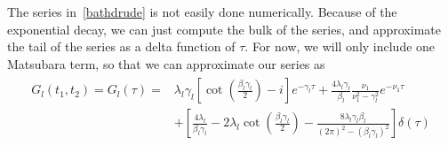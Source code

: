 \documentclass{article}
\newcommand{\ten}{\otimes}
\newcommand{\I}{\mathcal{I}}
\begin{document}
The series in~\ref{bathdrude} is not easily done numerically. Because of the exponential decay, we can just compute the bulk of the series, and approximate the tail of the series as a delta function of $\tau$. For now, we will only include one Matsubara term, so that we can approximate our series as
\begin{align}\label{corrapprox}
\begin{split}
G_l(t_1,t_2) = G_l(\tau) = &\lambda_l\gamma_l\left[\cot\left(\frac{\beta_l\gamma_l}{2}\right)-i\right]e^{-\gamma_l\tau}+\frac{4\lambda_l\gamma_l}{\beta_l}\frac{\nu_1}{\nu_1^2-\gamma_l^2}e^{-\nu_1\tau}\\
&+\left[\frac{4\lambda_l}{\beta_l\gamma_l}-2\lambda_l\cot\left(\frac{\beta_l\gamma_l}{2}\right) - \frac{8\lambda_l\gamma_l\beta_l}{(2\pi)^2-(\beta_l\gamma_l)^2}\right]\delta(\tau)
\end{split}
\end{align}

%
%
%
%
%
\end{document}

